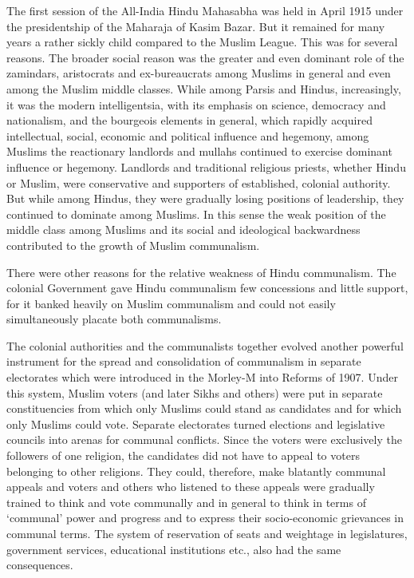 \begin{multicols}{2}
The first session of the All-India Hindu Mahasabha was held in April 1915 under the presidentship of the Maharaja of Kasim Bazar. But it remained for many years a rather sickly child compared to the Muslim League. This was for several reasons. The broader social reason was the greater and even dominant role of the zamindars, aristocrats and ex-bureaucrats among Muslims in general and even among the Muslim middle classes. While among Parsis and Hindus, increasingly, it was the modern intelligentsia, with its emphasis on science, democracy and nationalism, and the bourgeois elements in general, which rapidly acquired intellectual, social, economic and political influence and hegemony, among Muslims the reactionary landlords and mullahs continued to exercise dominant influence or hegemony. Landlords and traditional religious priests, whether Hindu or Muslim, were conservative and supporters of established, colonial authority. But while among Hindus, they were gradually losing positions of leadership, they continued to dominate among Muslims. In this sense the weak position of the middle class among Muslims and its social and ideological backwardness contributed to the growth of Muslim communalism. 

There were other reasons for the relative weakness of Hindu communalism. The colonial Government gave Hindu communalism few concessions and little support, for it banked heavily on Muslim communalism and could not easily simultaneously placate both communalisms. 

The colonial authorities and the communalists together evolved another powerful instrument for the spread and consolidation of communalism in separate electorates which were introduced in the Morley-M into Reforms of 1907. Under this system, Muslim voters (and later Sikhs and others) were put in separate constituencies from which only Muslims could stand as candidates and for which only Muslims could vote. Separate electorates turned elections and legislative councils into arenas for communal conflicts. Since the voters were exclusively the followers of one religion, the candidates did not have to appeal to voters belonging to other religions. They could, therefore, make blatantly communal appeals and voters and others who listened to these appeals were gradually trained to think and vote communally and in general to think in terms of `communal' power and progress and to express their socio-economic grievances in communal terms. The system of reservation of seats and weightage in legislatures, government services, educational institutions etc., also had the same consequences. 


\end{multicols}
